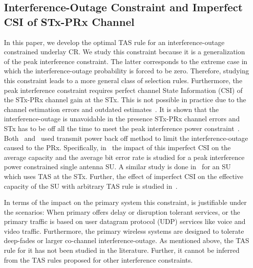 \documentclass[12pt,draftcls,peerreview,onecolumn]{IEEEtran}
\begin{document}
\subsection{Interference-Outage Constraint and Imperfect CSI of STx-PRx Channel }

 
In this paper, we develop the optimal TAS rule for an interference-outage constrained underlay CR. We study this constraint because it is a generalization of the peak interference constraint. The latter corresponds to the extreme case in which the interference-outage probability is forced to be zero. Therefore, studying this constraint leads to a more general class of selection rules. Furthermore, the peak interference constraint requires perfect channel State Information (CSI) of the STx-PRx channel gain at the STx. This is not possible in practice due to the channel estimation errors and outdated estimates~\cite{musavian_2009_tcom}. It is shown that the interference-outage is unavoidable in the presence STx-PRx channel errors and STx has to be off all the time to meet the peak interference power constraint~\cite{musavian_2009_tcom,Suraweera_2010_TVT,Peng_2016_eurasip}. Both~\cite{Suraweera_2010_TVT} and~\cite{Peng_2016_eurasip} used transmit power back off method to limit the interference-outage caused to the PRx. Specifically, in~\cite{Suraweera_2010_TVT} the impact of this imperfect CSI on the average capacity and the average bit error rate is studied for a peak interference power constrained single antenna SU. A similar study is done in~\cite{Peng_2016_eurasip} for an SU which uses TAS at the STx. Further, the effect of imperfect CSI on the effective capacity of the SU with arbitrary TAS rule is studied in~\cite{Li_2011_commLet}. 


In terms of the impact on the primary system this constraint, is justifiable under the scenarios: When primary offers delay or disruption tolerant services, or the primary traffic is based on user datagram protocol (UDP) services like voice and video traffic. Furthermore, the primary wireless systems are designed to tolerate deep-fades or larger co-channel interference-outage. As mentioned above, the TAS rule for it has not been studied in the literature. Further, it cannot be inferred from the TAS rules proposed for other interference constraints. 
\end{document}

